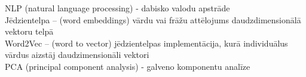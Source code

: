 NLP (natural language processing) - dabisko valodu apstrāde\\
Jēdzientelpa – (word embeddings) vārdu vai frāžu attēlojums daudzdimensionālā vektoru telpā\\
Word2Vec – (word to vector) jēdzientelpas implementācija, kurā individuālus vārdus aizstāj
daudzimensionāli vektori\\
PCA (principal component analysis) - galveno komponentu analīze